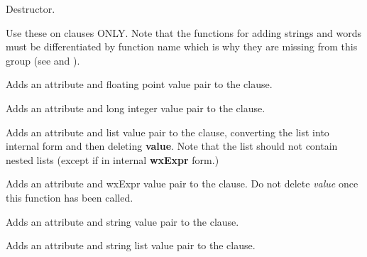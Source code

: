 

Destructor.

\label{wxexpraddattributevalue}

Use these on clauses ONLY. Note that the functions for adding strings
and words must be differentiated by function name which is why
they are missing from this group (see  and
\rtfsp{}).


Adds an attribute and floating point value pair to the clause.


Adds an attribute and long integer value pair to the clause.


Adds an attribute and list value pair to the clause, converting the list into
internal form and then deleting {\bf value}. Note that the list should not contain
nested lists (except if in internal {\bf wxExpr} form.)


Adds an attribute and wxExpr value pair to the clause. Do not delete\rtfsp
{\it value} once this function has been called.

\label{wxexpraddattributevaluestring}


Adds an attribute and string value pair to the clause.

\label{wxexpraddattributevaluestringlist}


Adds an attribute and string list value pair to the clause.

